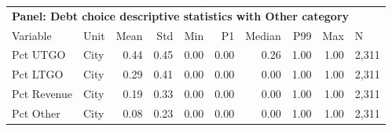 \begin{table}[H]
\centering
\begin{tabular*}{\textwidth}{@{\extracolsep{\fill}}llrrrrrrrl}
\multicolumn{10}{l}{\textbf{Panel: Debt choice descriptive statistics with Other category}}\\

\addlinespace
  \toprule
Variable & Unit & Mean & Std & Min & P1 & Median & P99 & Max & N \\ 
  \hline
Pct UTGO & City & 0.44 & 0.45 & 0.00 & 0.00 & 0.26 & 1.00 & 1.00 & 2,311 \\ 
  Pct LTGO & City & 0.29 & 0.41 & 0.00 & 0.00 & 0.00 & 1.00 & 1.00 & 2,311 \\ 
  Pct Revenue & City & 0.19 & 0.33 & 0.00 & 0.00 & 0.00 & 1.00 & 1.00 & 2,311 \\ 
  Pct Other & City & 0.08 & 0.23 & 0.00 & 0.00 & 0.00 & 1.00 & 1.00 & 2,311 \\ 
   \hline
\end{tabular*}
\end{table}
